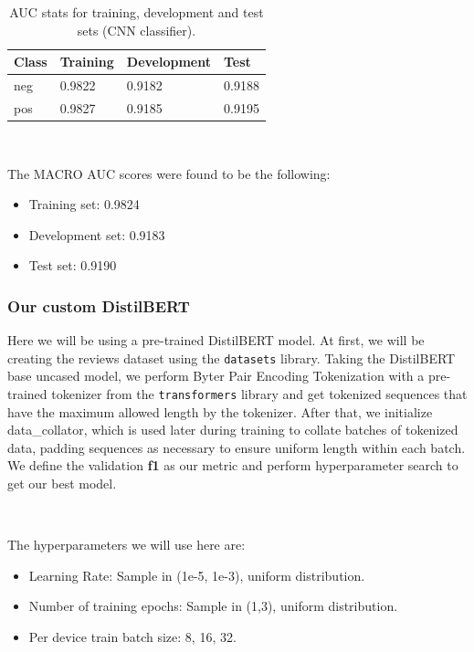 \documentclass[10pt, a4paper]{article}
\begin{document}
	\begin{table}
		\begin{tabular}{|l|l|l|l|}
			\hline
			\cellcolor{blue!25}\textbf{Class} & \cellcolor{blue!25}\textbf{Training} & \cellcolor{blue!25}\textbf{Development} & \cellcolor{blue!25}\textbf{Test}\\
			\hline
			neg & 0.9822 & 0.9182 & 0.9188 \\\hline
			pos & 0.9827 & 0.9185 & 0.9195 \\\hline
			
		\end{tabular}
		\centering
		\caption{AUC stats for training, development and test sets (CNN classifier).}
		\label{tab::ex-2-stats-auc}
	\end{table}
	\
	
	The MACRO AUC scores were found to be the following:
	\begin{itemize}
		\item Training set: 0.9824
		\item Development set: 0.9183
		\item Test set: 0.9190
	\end{itemize}

        \subsubsection{Our custom DistilBERT}
        
        Here we will be using a pre-trained DistilBERT model. At first, we will be creating the reviews dataset using the \texttt{datasets} library. Taking the DistilBERT base uncased model, we perform Byter Pair Encoding Tokenization with a pre-trained tokenizer from the \texttt{transformers} library and get tokenized sequences that have the maximum allowed length by the tokenizer. After that, we initialize data\_collator, which is used later during training to collate batches of tokenized data, padding sequences as necessary to ensure uniform length within each batch. We define the validation \textbf{f1} as our metric and perform hyperparameter search to get our best model. 
        \ 
        
        \
 
    The hyperparameters we will use here are:
    \begin{itemize}
        \item Learning Rate: Sample in (1e-5, 1e-3), uniform distribution.
        \item Number of training epochs: Sample in (1,3), uniform distribution.
        \item Per device train batch size: 8, 16, 32.
        
    \end{itemize}
\end{document}
